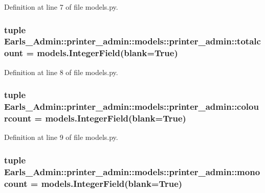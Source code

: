 Definition at line 7 of file models.py.\hypertarget{classEarls__Admin_1_1printer__admin_1_1models_1_1printer__admin_f60d770c368c6dae840ccdeca7c4db2a}{
\subsubsection[totalcount]{\setlength{\rightskip}{0pt plus 5cm}tuple {\bf Earls\_\-Admin::printer\_\-admin::models::printer\_\-admin::totalcount} = models.IntegerField(blank=True)}}
\label{classEarls__Admin_1_1printer__admin_1_1models_1_1printer__admin_f60d770c368c6dae840ccdeca7c4db2a}




Definition at line 8 of file models.py.\hypertarget{classEarls__Admin_1_1printer__admin_1_1models_1_1printer__admin_d6c2ad0df0522f351cce1fe942971353}{
\subsubsection[colourcount]{\setlength{\rightskip}{0pt plus 5cm}tuple {\bf Earls\_\-Admin::printer\_\-admin::models::printer\_\-admin::colourcount} = models.IntegerField(blank=True)}}
\label{classEarls__Admin_1_1printer__admin_1_1models_1_1printer__admin_d6c2ad0df0522f351cce1fe942971353}




Definition at line 9 of file models.py.\hypertarget{classEarls__Admin_1_1printer__admin_1_1models_1_1printer__admin_f479cde406f224d4536817b3ddecf9c1}{
\subsubsection[monocount]{\setlength{\rightskip}{0pt plus 5cm}tuple {\bf Earls\_\-Admin::printer\_\-admin::models::printer\_\-admin::monocount} = models.IntegerField(blank=True)}}
\label{classEarls__Admin_1_1printer__admin_1_1models_1_1printer__admin_f479cde406f224d4536817b3ddecf9c1}





